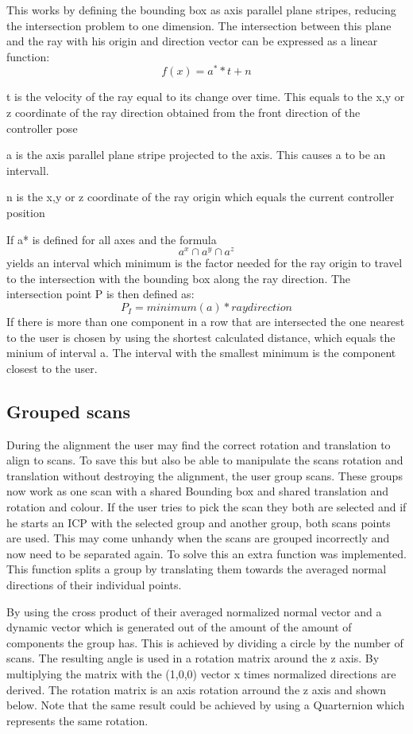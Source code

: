 \documentclass[hyperref,english,bachelorofscience,bibnum]{cgvpub}
\begin{document}
This works by defining the bounding box as axis parallel plane stripes, reducing the intersection problem to one dimension. The intersection between this plane and the ray with his origin and direction vector can be expressed as a linear function:
\[
 f(x) = a^* * t + n
\]

t is the velocity of the ray equal to its change over time. This equals to the x,y or z coordinate of the ray direction obtained from the front direction of the controller pose

a is the axis parallel plane stripe projected to the axis. This causes a to be an intervall.

n is the x,y or z coordinate of the ray origin which equals the current controller position

If a* is defined for all axes and the formula 
\[
a^x \cap a^y \cap a^z
\]
yields an interval which minimum is the factor needed for the ray origin to travel to the intersection with the bounding box along the ray direction.
The intersection point P is then defined as:
\[
P_I = minimum(a) * raydirection
\]
If there is more than one component in a row that are intersected the one nearest to the user is chosen by using the shortest calculated distance, which equals the minium of interval a. The interval with the smallest minimum is the component closest to the user.

\subsection{Grouped scans}

During the alignment the user may find the correct rotation and translation to align to scans. To save this but also be able to manipulate the scans rotation and translation without destroying the alignment, the user group scans. These groups now work as one scan with a shared Bounding box and shared translation and rotation and colour. If the user tries to pick the scan they both are selected and if he starts an ICP with the selected group and another group, both scans points are used.
This may come unhandy when the scans are grouped incorrectly and now need to be separated again. To solve this an extra function was implemented. This function splits a group by translating them towards the averaged normal directions of their individual points.

By using the cross product of their averaged normalized normal vector and a dynamic vector which is generated out of the amount of the amount of components the group has.
This is achieved by dividing a circle by the number of scans. The resulting angle is used in a rotation matrix around the z axis. By multiplying the matrix with the (1,0,0) vector x times normalized directions are derived.
The rotation matrix is an axis rotation arround the z axis and shown below. Note that the same result could be achieved by using a Quarternion which represents the same rotation.
\end{document}
